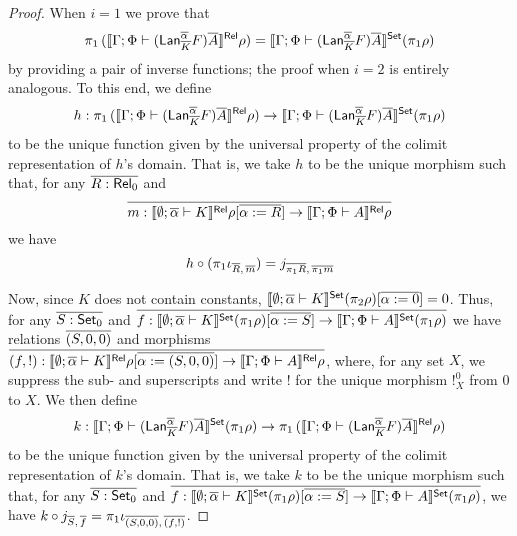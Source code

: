 \documentclass{lmcs}
\theoremstyle{plain}\newtheorem{satz}[thm]{Satz}
\newcommand{\set}{\mathsf{Set}}
\begin{document}
{\begin{proof}
When $i = 1$ we prove that
\[
\pi_1 \,( \relsem{ \Gamma; \Phi \vdash (\Lan^{\ol \alpha}_{\ol{K}}
  F)\ol{A} } \rho ) = \setsem{ \Gamma; \Phi \vdash (\Lan^{\ol
    \alpha}_{\ol{K}} F)\ol{A} } (\pi_1 \rho)
\]
by
providing a pair of inverse functions; the proof when $i=2$ is
entirely analogous. To this end, we define
\[
h : \pi_1\, ( \relsem{ \Gamma; \Phi \vdash (\Lan^{\ol \alpha}_{\ol{K}}
  F)\ol{A} } \rho ) \to \setsem{ \Gamma; \Phi \vdash (\Lan^{\ol
    \alpha}_{\ol{K}} F)\ol{A} } (\pi_1 \rho)
\]
to be the unique function given by the universal property of the
colimit representation of $h$'s domain. That is, we take $h$ to be the
unique morphism such that, for any $\overline{R : \mathsf{Rel}_0}$ and
\[\overline{m :
  \llbracket{ \emptyset; \overline{\alpha} \vdash K }\rrbracket^{\mathsf{Rel}} \rho[\overline{\alpha := R}] \to
  \llbracket{ \Gamma; \Phi \vdash A }\rrbracket^{\mathsf{Rel}} \rho}\] we have
\begin{equation}\label{eq:cocone-proj}
h \circ (\pi_1 \iota_{\overline{R},\, \overline{m}}) = j_{\overline{\pi_1 R},
  \,\overline{\pi_1 m}}
\end{equation}

Now, since $K$ does not contain constants, $\setsem{ \emptyset;
  \ol\alpha \vdash K } (\pi_2 \rho) [\ol{\alpha := 0}] = 0$. Thus, for
any $\ol{S : \set_0}$ and $\ol{f : \setsem{ \emptyset; \ol\alpha
    \vdash K } (\pi_1 \rho)[\ol{\alpha := S}] \to \setsem{ \Gamma;
    \Phi \vdash A } (\pi_1 \rho)} $ we have relations $\overline{(S, 0, 0)}$
and morphisms $\overline{(f, !) : \llbracket{ \emptyset; \overline{\alpha} \vdash K }\rrbracket^{\mathsf{Rel}}
  \rho[\overline{\alpha := (S, 0, 0)}] \to \llbracket{ \Gamma; \Phi \vdash A }\rrbracket^{\mathsf{Rel}}
  \rho}$, where, for any set $X$, we suppress the sub- and
superscripts and write $!$ for the unique morphism $!^0_X$ from $0$ to
$X$. We then define
\[
k : \setsem{ \Gamma; \Phi \vdash (\Lan^{\ol \alpha}_{\ol{K}} F)\ol{A}
} (\pi_1 \rho) \to \pi_1 \,( \relsem{ \Gamma; \Phi \vdash (\Lan^{\ol
    \alpha}_{\ol{K}} F)\ol{A} } \rho )
\]
to be the unique function given by the universal property of the
colimit representation of $k$'s domain. That is, we take $k$ to be the
unique morphism such that, for any $\ol{S : \set_0}$ and $\ol{f :
  \setsem{ \emptyset; \ol\alpha \vdash K } (\pi_1 \rho)[\ol{\alpha :=
      S}] \to \setsem{ \Gamma; \Phi \vdash A } (\pi_1 \rho)}$, we have
$k \circ j_{\overline{S},\, \overline{f}} = \pi_1 \iota_{\overline{(S, 0, 0)},\, \overline{(f,
    !)}}$.


\end{proof}}
\end{document}
